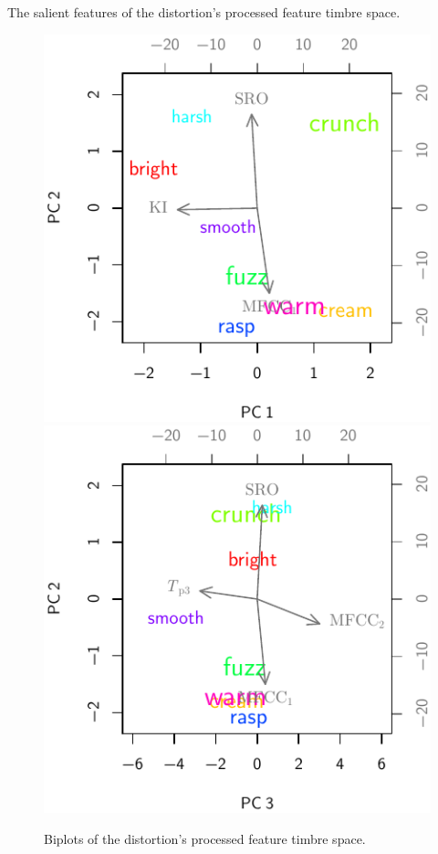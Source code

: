 			\begin{datum}[h!]
				\centering
				\begin{minipage}{0.9\textwidth}
					
				\end{minipage}
				\caption{The salient features of the distortion's 
					 processed feature timbre space.}
				\label{dat:DistortionProcessedCorrelations}
			\end{datum}

			\begin{figure}[h!]
				\centering
				\subfloat
				{
					\includegraphics{chapter4/Images/DistortionProcessedCentroidsPCA1-2.pdf}
					\label{fig:DistortionProcessedCentroidsPCA1-2}
				}
				\quad
				\subfloat
				{
					\includegraphics{chapter4/Images/DistortionProcessedCentroidsPCA3-2.pdf}
					\label{fig:DistortionProcessedCentroidsPCA3-2}
				}
				\caption{Biplots of the distortion's processed feature timbre space.}
				\label{fig:DistortionProcessedCentroidsPCAs}
			\end{figure}

